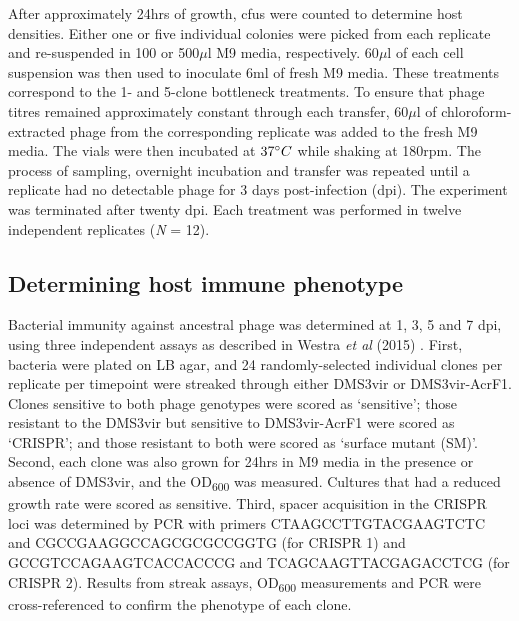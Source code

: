\documentclass [12pt, a4paper, twoside]  {article}
\newcommand{\sub}{\textsubscript}
\begin{document}
After approximately 24hrs of growth, cfus were counted to determine host densities. Either one or five individual colonies were picked from each replicate and re-suspended in 100 or 500$\mu$l M9 media, respectively. 60$\mu$l of each cell suspension was then used to inoculate 6ml of fresh M9 media. These treatments correspond to the 1- and 5-clone bottleneck treatments. To ensure that phage titres remained approximately constant through each transfer,  60$\mu$l of chloroform-extracted phage from the corresponding replicate was added to the fresh M9 media. The vials were then incubated at $37\degree{}C$ while shaking at 180rpm. The process of sampling, overnight incubation and transfer was repeated until a replicate had no detectable phage for 3 days post-infection (dpi). The experiment was terminated after twenty dpi. Each treatment was performed in twelve independent replicates (\textit{N} = 12).

\subsection*{Determining host immune phenotype}
Bacterial immunity against ancestral phage was determined at 1, 3, 5 and 7 dpi, using three independent assays as described in Westra \textit{et al} (2015) \cite{westra2015currbiol}. First, bacteria were plated on LB agar, and 24 randomly-selected individual clones per replicate per timepoint were streaked through either DMS3vir or DMS3vir-AcrF1. Clones sensitive to both phage genotypes were scored as `sensitive'; those resistant to the DMS3vir but sensitive to DMS3vir-AcrF1 were scored as `CRISPR'; and those resistant to both were scored as `surface mutant (SM)'. Second, each clone was also grown for 24hrs in M9 media in the presence or absence of DMS3vir, and the OD\sub{600} was measured. Cultures that had a reduced growth rate were scored as sensitive. Third, spacer acquisition in the CRISPR loci was determined by PCR with primers CTAAGCCTTGTACGAAGTCTC and CGCCGAAGGCCAGCGCGCCGGTG (for CRISPR 1) and GCCGTCCAGAAGTCACCACCCG and TCAGCAAGTTACGAGACCTCG (for CRISPR 2). Results from streak assays, OD\sub{600} measurements and PCR were cross-referenced to confirm the phenotype of each clone.
\end{document}

